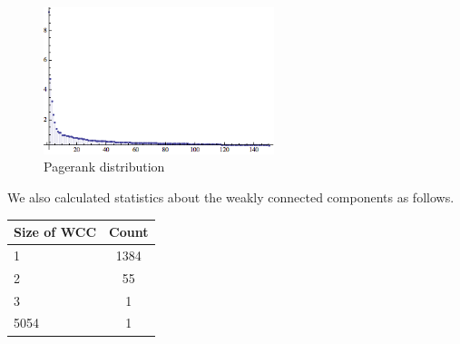 \begin{figure}[htbf]
\begin{center}
     \includegraphics[width=0.6\textwidth]{FIG/pagerank.png}
\caption{Pagerank distribution}
\label{fig:pagerank}
\end{center}
\end{figure}

We also calculated statistics about the weakly connected components as follows.

\begin{center}
\begin{tabular}{| l | c |}
  \hline                        
  Size of WCC & Count  \\ \hline
  1 & 1384  \\ \hline
  2 & 55  \\ \hline
  3 & 1 \\ \hline
  5054 & 1 \\ \hline  
\end{tabular}
\end{center}

